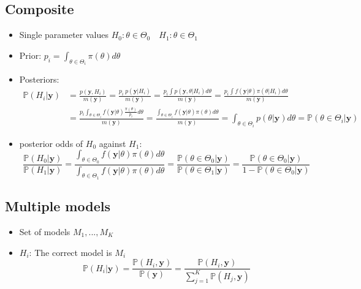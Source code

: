 \documentclass[12pt]{article}
\theoremstyle{definition}
\newcommand{\Prob}[1]{\mathbb{P}(#1)}
\begin{document}
\subsection*{Composite}
\begin{itemize}
    \item Single parameter values $H_0:\theta \in \Theta_0 \quad H_1:\theta \in \Theta_1$
    \item Prior: $p_i = \int_{\theta \in \Theta_i}\pi(\theta) d\theta$
    \item Posteriors:
        \begin{align*}
            \Prob{H_i|\bm{y}} &= \frac{p(\bm{y},H_i)}{m(\bm{y})} = \frac{p_i\ p(\bm{y}|H_i)}{m(\bm{y})} = \frac{p_i\int p(\bm{y},\theta|H_i)d\theta}{m(\bm{y})} = \frac{p_i\int f(\bm{y}|\theta)\pi(\theta|H_i) d\theta}{m(\bm{y})}\\
            &= \frac{p_i\int_{\theta \in \Theta_i} f(\bm{y}|\theta)\frac{\pi(\theta)}{p_i} d\theta}{m(\bm{y})} = \frac{\int_{\theta \in \Theta_i} f(\bm{y}|\theta)\pi(\theta) d\theta}{m(\bm{y})} = \int_{\theta \in \Theta_i} p(\theta|\bm{y}) d\theta = \Prob{\theta \in \Theta_i|\bm{y}}
        \end{align*}
    \item posterior odds of $H_0$ against $H_1$:
        $$\frac{\Prob{H_0|\bm{y}}}{\Prob{H_1|\bm{y}}} = \frac{\int_{\theta \in \Theta_0}f(\bm{y}|\theta) \pi(\theta)d\theta}{\int_{\theta \in \Theta_1}f(\bm{y}|\theta) \pi(\theta)d\theta} = \frac{\Prob{\theta \in \Theta_0|\bm{y}}}{\Prob{\theta \in \Theta_1|\bm{y}}} = \frac{\Prob{\theta \in \Theta_0|\bm{y}}}{1-\Prob{\theta \in \Theta_0|\bm{y}}}$$
\end{itemize}
\subsection*{Multiple models}
\begin{itemize}
    \item Set of models $M_1,...,M_K$
    \item $H_i$: The correct model is $M_i$
    $$\Prob{H_i|\bm{y}} = \frac{\Prob{H_i, \bm{y}}}{\Prob{\bm{y}}} = \frac{\Prob{H_i, \bm{y}}}{\sum_{j=1}^K \Prob{H_j,\bm{y}}}$$
\end{itemize}
\newpage
\end{document}
